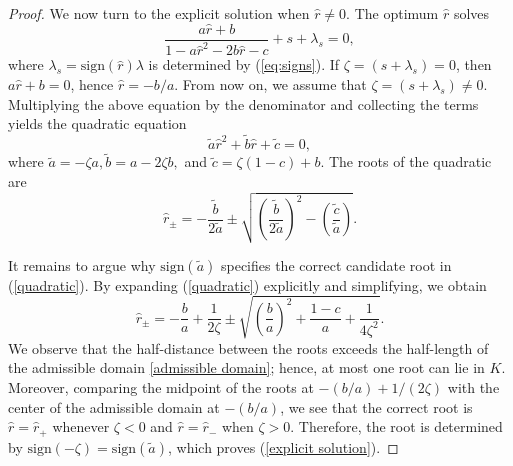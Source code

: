 \documentclass[12pt]{amsart}
\numberwithin{equation}{section}
\numberwithin{equation}{section}
\theoremstyle{plain}
\theoremstyle{definition}
\newcommand{\sign}{\mathrm{sign}}
\begin{document}
\begin{proof}
We now turn to the explicit solution when $\hat{r}\neq 0$. The optimum $\hat{r}$ solves
\begin{equation*}
\frac{ a\hat{r} +b}{1-a \hat{r}^2 - 2b \hat{r} -c} + s + \lambda_s=0,
\end{equation*}
where $\lambda_s=  \sign(\hat{r}) \lambda$ is determined by (\ref{eq:signs}). If $\zeta=(s + \lambda_s)=0$, then $a\hat{r}+b=0$, hence $\hat{r}=-b/a$. From now on, we assume that $\zeta=(s + \lambda_s)\neq 0$. Multiplying the above equation by the denominator and collecting the terms yields the quadratic equation
$$
\tilde{a} \hat{r}^2 + \tilde{b} \hat{r} + \tilde{c} = 0,
$$
where $\tilde{a}  = -\zeta a, \tilde{b} = a -2\zeta b, $ and $\tilde{c} =\zeta(1-c)+b $. The roots of the quadratic are
\begin{equation}\label{quadratic}
\hat{r}_{\pm} = -\frac{\tilde{b}}{2\tilde{a}} \pm\sqrt{\left(\frac{\tilde{b}}{2\tilde{a}}\right)^2 - \left(\frac{\tilde{c}}{\tilde{a}}\right)}.
\end{equation}


It remains to argue why $\sign(\tilde{a})$ specifies the correct candidate root in (\ref{quadratic}). 
By expanding (\ref{quadratic}) explicitly and simplifying, we obtain
    \begin{equation*}
        \hat{r}_{\pm}=-\dfrac{b}{a}+\dfrac{1}{2\zeta}\pm\sqrt{\left(\dfrac{b}{a}\right)^2+\dfrac{1-c}{a}+\dfrac{1}{4\zeta^2}}.
    \end{equation*}
We observe that the half-distance between the roots exceeds the half-length of the admissible domain
\eqref{admissible domain}; hence, at most one root can lie in $K$. Moreover, comparing the midpoint of the roots at $-(b/a)+1/(2\zeta)$ with the center of the admissible domain at $-(b/a)$, we see that the correct root is $\hat{r}=\hat{r}_+$ whenever $\zeta<0$ and $\hat{r}=\hat{r}_-$ when $\zeta>0$. Therefore, the root is determined by $\sign(-\zeta)=\sign(\tilde{a})$, which proves (\ref{explicit solution}). 
\end{proof}
\end{document}
